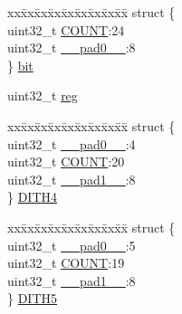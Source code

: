 \begin{DoxyCompactItemize}
\begin{tabbing}
\end{tabbing}\item 
\begin{tabbing}
xx\=xx\=xx\=xx\=xx\=xx\=xx\=xx\=xx\=\kill
struct \{\\
\>uint32\_t \mbox{\hyperlink{union_t_c_c___c_o_u_n_t___type_aa9f8906e3d27dfbf12691127c9bb88ba}{COUNT}}:24\\
\>uint32\_t \mbox{\hyperlink{union_t_c_c___c_o_u_n_t___type_a3e57c2ef1c3ffb36722f000cc1156824}{\_\_pad0\_\_}}:8\\
\} \mbox{\hyperlink{union_t_c_c___c_o_u_n_t___type_a6e4e575ec8fe5a7e774a98f8c2bec9bf}{bit}}\\

\end{tabbing}\item 
uint32\+\_\+t \mbox{\hyperlink{union_t_c_c___c_o_u_n_t___type_a6b91636401516a477989a336376d7b40}{reg}}
\item 
\begin{tabbing}
xx\=xx\=xx\=xx\=xx\=xx\=xx\=xx\=xx\=\kill
struct \{\\
\>uint32\_t \mbox{\hyperlink{union_t_c_c___c_o_u_n_t___type_a3e57c2ef1c3ffb36722f000cc1156824}{\_\_pad0\_\_}}:4\\
\>uint32\_t \mbox{\hyperlink{union_t_c_c___c_o_u_n_t___type_aa9f8906e3d27dfbf12691127c9bb88ba}{COUNT}}:20\\
\>uint32\_t \mbox{\hyperlink{union_t_c_c___c_o_u_n_t___type_a6712ba6dd1d5b43d2d56ff8ac4e275a7}{\_\_pad1\_\_}}:8\\
\} \mbox{\hyperlink{union_t_c_c___c_o_u_n_t___type_a3c21e7f9f26ab15431a82973b6b54ec8}{DITH4}}\\

\end{tabbing}\item 
\begin{tabbing}
xx\=xx\=xx\=xx\=xx\=xx\=xx\=xx\=xx\=\kill
struct \{\\
\>uint32\_t \mbox{\hyperlink{union_t_c_c___c_o_u_n_t___type_a3e57c2ef1c3ffb36722f000cc1156824}{\_\_pad0\_\_}}:5\\
\>uint32\_t \mbox{\hyperlink{union_t_c_c___c_o_u_n_t___type_aa9f8906e3d27dfbf12691127c9bb88ba}{COUNT}}:19\\
\>uint32\_t \mbox{\hyperlink{union_t_c_c___c_o_u_n_t___type_a6712ba6dd1d5b43d2d56ff8ac4e275a7}{\_\_pad1\_\_}}:8\\
\} \mbox{\hyperlink{union_t_c_c___c_o_u_n_t___type_a4bd3c85c02a585dc18b7ed5171f0ce1c}{DITH5}}\\


\end{tabbing}
\end{DoxyCompactItemize}
